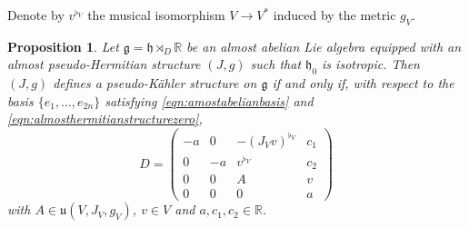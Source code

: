 \documentclass{article}
\newtheorem{proposition}[theorem]{Proposition}
\theoremstyle{definition}
\newcommand{\R}{\mathbb{R}}
\newcommand{\frg}{\mathfrak{g}}
\newcommand{\frh}{\mathfrak{h}}
\newcommand{\lie}[1]{\mathfrak{#1}}
\begin{document}
Denote by $v^{\flat_V}$ the musical isomorphism $V\to V^*$ induced by the metric $g_V$.

\begin{proposition}\label{prop:characterization_isotropic_case}
    Let $\frg=\frh\rtimes_D\R$ be an almost abelian Lie algebra equipped with an almost pseudo-Hermitian structure $(J,g)$ such that $\lie h_0$ is isotropic. Then $(J,g)$ defines a pseudo-Kähler structure on $\frg$ if and only if, with respect to the basis $\{e_1,\dotsc, e_{2n}\}$ satisfying \eqref{eqn:amostabelianbasis} and \eqref{eqn:almosthermitianstructurezero},
    \begin{equation}\label{eq:D_zero_g0}
        D=\begin{pmatrix}
            -a&0&-(J_Vv)^{\flat_V}&c_1\\
            0&-a&v^{\flat_V}&c_2\\
            0&0&A&v\\
            0&0&0&a
        \end{pmatrix}
    \end{equation} with $A\in\mathfrak{u}(V,J_V,g_V)$, $v\in V$ and $a,c_1,c_2\in\R$.
\end{proposition}
\end{document}
